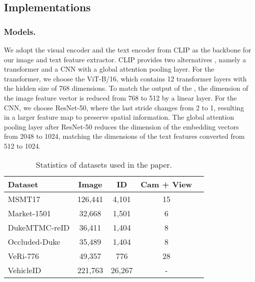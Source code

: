 \documentclass[letterpaper]{article} \usepackage{aaai23}  \usepackage{times}  \usepackage{helvet}  \usepackage{courier}  \usepackage[hyphens]{url}  \usepackage{graphicx} \urlstyle{rm} \def\UrlFont{\rm}  \usepackage{natbib}  \usepackage{caption} \frenchspacing  \setlength{\pdfpagewidth}{8.5in}  \setlength{\pdfpageheight}{11in}  \usepackage{algorithm}
\begin{document}
\subsection{Implementations}
\subsubsection{Models.} We adopt the visual encoder  and the text encoder   from CLIP as the backbone for our image and text feature extractor. CLIP provides two alternatives , namely a transformer and a CNN with a global attention pooling layer. For the transformer, we choose the ViT-B/16, which contains 12 transformer layers with the hidden size of 768 dimensions. To match the output of the , the dimension of the image feature vector is reduced from 768 to 512 by a linear layer. For the CNN, we choose ResNet-50, where the last stride changes from 2 to 1, resulting in a larger feature map to preserve spatial information. The global attention pooling layer after ResNet-50 reduces the dimension of the embedding vectors from 2048 to 1024, matching the dimensions of the text features converted from 512 to 1024.


\begin{table}[]
\centering
\begin{tabular}{l|c c c c}
    \hline
    Dataset  & Image & ID & Cam + View\\
    \hline
    MSMT17 & 126,441 & 4,101 & 15\\
    Market-1501 & 32,668 & 1,501 & 6\\
    DukeMTMC-reID & 36,411 & 1,404 & 8 \\
    Occluded-Duke & 35,489 & 1,404 & 8 \\
    VeRi-776 & 49,357 & 776 & 28 \\
    VehicleID & 221,763 & 26,267 & - \\
    \hline
\end{tabular}
\caption{Statistics of datasets used in the paper.}
\label{tab:dataset}
\end{table}
\end{document}
